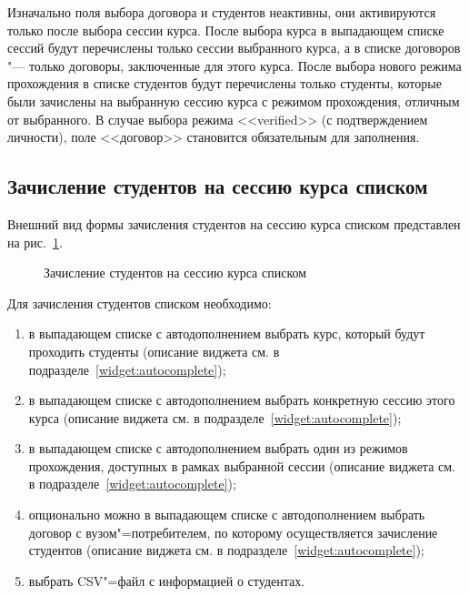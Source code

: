 Изначально поля выбора договора и студентов неактивны, они активируются только после выбора сессии курса.
После выбора курса в выпадающем списке сессий будут перечислены только сессии выбранного курса, 
а в списке договоров "--- только договоры, заключенные для этого курса.
После выбора нового режима прохождения в списке студентов будут перечислены только студенты, 
которые были зачислены на выбранную сессию курса с режимом прохождения, отличным от выбранного.
В случае выбора режима <<verified>> (с подтверждением личности), поле <<договор>> становится обязательным для заполнения.


\subsection{Зачисление студентов на сессию курса списком}
Внешний вид формы зачисления студентов на сессию курса списком представлен на рис.~\ref{img:student:mass_enroll}.

\begin{figure}[H]
	\caption{Зачисление студентов на сессию курса списком}
	\label{img:student:mass_enroll}
\end{figure}

Для зачисления студентов списком необходимо:
\begin{enumerate}
	\item в выпадающем списке с автодополнением выбрать курс, который будут проходить студенты 
	(описание виджета см. в подразделе~\ref{widget:autocomplete});
	\item в выпадающем списке с автодополнением выбрать конкретную сессию этого курса 
	(описание виджета см. в подразделе~\ref{widget:autocomplete});
	\item в выпадающем списке с автодополнением выбрать один из режимов прохождения, доступных в рамках выбранной сессии 
	(описание виджета см. в подразделе~\ref{widget:autocomplete});
	\item опционально можно в выпадающем списке с автодополнением выбрать договор с вузом"=потребителем, 
	по которому осуществляется зачисление студентов (описание виджета см. в подразделе~\ref{widget:autocomplete});
	\item выбрать CSV"=файл с информацией о студентах. 
\end{enumerate}

